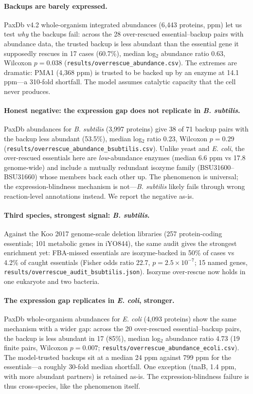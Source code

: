 \documentclass[12pt]{article}
\begin{document}
\paragraph{Backups are barely expressed.}
PaxDb v4.2 whole-organism integrated abundances (6{,}443 proteins, ppm)
let us test \emph{why} the backups fail: across the 28 over-rescued
essential--backup pairs with abundance data, the trusted backup is less
abundant than the essential gene it supposedly rescues in 17 cases
(60.7\%), median log$_2$ abundance ratio 0.63, Wilcoxon
$p=0.038$ (\texttt{results/overrescue\_abundance.csv}). The extremes
are dramatic: PMA1 (4{,}368 ppm) is trusted to be backed up by an
enzyme at 14.1 ppm---a 310-fold shortfall. The model assumes catalytic
capacity that the cell never produces.
\paragraph{Honest negative: the expression gap does not replicate in
\emph{B. subtilis}.}
PaxDb abundances for \emph{B. subtilis} (3{,}997 proteins) give 38 of
71 backup pairs with the backup less abundant (53.5\%), median log$_2$
ratio 0.23, Wilcoxon $p=0.29$
(\texttt{results/overrescue\_abundance\_bsubtilis.csv}). Unlike
yeast and \emph{E. coli}, the over-rescued essentials here are
\emph{low}-abundance enzymes (median 6.6 ppm vs 17.8 genome-wide) and
include a mutually redundant isozyme family (BSU31600--BSU31660) whose
members back each other up. The phenomenon is universal; the
expression-blindness mechanism is not---\emph{B. subtilis} likely fails
through wrong reaction-level annotations instead. We report the
negative as-is.

\paragraph{Third species, strongest signal: \emph{B. subtilis}.}
Against the Koo 2017 genome-scale deletion libraries (257 protein-coding
essentials; 101 metabolic genes in iYO844), the same audit gives the
strongest enrichment yet: FBA-missed essentials are isozyme-backed in
50\% of cases vs 4.2\% of caught essentials (Fisher odds ratio 22.7,
$p=2.5\times10^{-7}$; 15 named genes,
\texttt{results/overrescue\_audit\_bsubtilis.json}). Isozyme
over-rescue now holds in one eukaryote and two bacteria.

\paragraph{The expression gap replicates in \emph{E. coli}, stronger.}
PaxDb whole-organism abundances for \emph{E. coli} (4{,}093 proteins)
show the same mechanism with a wider gap: across the 20 over-rescued
essential--backup pairs, the backup is less abundant in 17 (85\%),
median log$_2$ abundance ratio 4.73 (19 finite pairs, Wilcoxon
$p=0.007$; \texttt{results/overrescue\_abundance\_ecoli.csv}). The
model-trusted backups sit at a median 24 ppm against 799 ppm for the
essentials---a roughly 30-fold median shortfall. One exception
(tnaB, 1.4 ppm, with more abundant partners) is retained as-is.
The expression-blindness failure is thus cross-species, like the
phenomenon itself.
\end{document}
